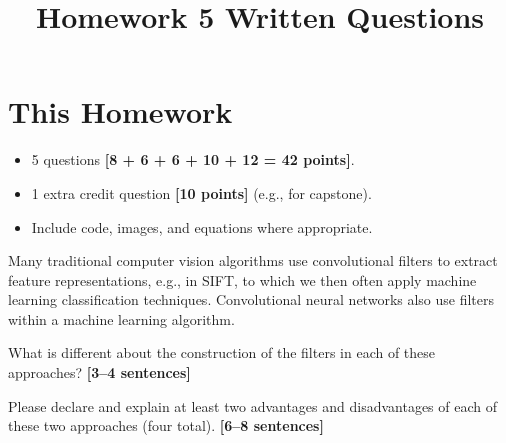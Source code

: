 \documentclass{csci1430}
\begin{document}
\title{Homework 5 Written Questions}
\maketitle
\thispagestyle{fancy}

\writeinstructions

\section*{This Homework}
\begin{itemize}
    \item 5 questions \textbf{[8 + 6 + 6 + 10 + 12 = 42 points]}.
    \item 1 extra credit question \textbf{[10 points]} (e.g., for capstone).
    \item Include code, images, and equations where appropriate.
\end{itemize}


\pagebreak
\begin{question}[points=8,drawbox=false]
Many traditional computer vision algorithms use convolutional filters to extract feature representations, e.g., in SIFT, to which we then often apply machine learning classification techniques. Convolutional neural networks also use filters within a machine learning algorithm.
\end{question}

\begin{subquestion}[points=4]
What is different about the construction of the filters in each of these approaches? \textbf{[3--4 sentences]}
\end{subquestion}

\begin{answer}[height=16]
    
\end{answer}

\pagebreak
\begin{subquestion}[points=4]
Please declare and explain at least two advantages and disadvantages of each of these two approaches (four total). \textbf{[6--8 sentences]}
\end{subquestion}

\begin{answer}[height=16]

\end{answer}
\end{document}
